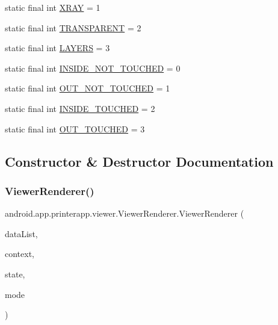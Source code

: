 \begin{DoxyCompactItemize}
\item 
static final int \hyperlink{classandroid_1_1app_1_1printerapp_1_1viewer_1_1_viewer_renderer_ae2e879aa426ef0bd7d4e5b78022bbc43}{X\+R\+AY} = 1
\item 
static final int \hyperlink{classandroid_1_1app_1_1printerapp_1_1viewer_1_1_viewer_renderer_acc60cdcb6df6d01f44e621bc38c82dea}{T\+R\+A\+N\+S\+P\+A\+R\+E\+NT} = 2
\item 
static final int \hyperlink{classandroid_1_1app_1_1printerapp_1_1viewer_1_1_viewer_renderer_a87a1aa256f7260b3e0dbb63f94916011}{L\+A\+Y\+E\+RS} = 3
\item 
static final int \hyperlink{classandroid_1_1app_1_1printerapp_1_1viewer_1_1_viewer_renderer_a57bbafdb88518add736565dc24d11124}{I\+N\+S\+I\+D\+E\+\_\+\+N\+O\+T\+\_\+\+T\+O\+U\+C\+H\+ED} = 0
\item 
static final int \hyperlink{classandroid_1_1app_1_1printerapp_1_1viewer_1_1_viewer_renderer_a6ea42cbf2db28c2ed76eb4e4e01f6c34}{O\+U\+T\+\_\+\+N\+O\+T\+\_\+\+T\+O\+U\+C\+H\+ED} = 1
\item 
static final int \hyperlink{classandroid_1_1app_1_1printerapp_1_1viewer_1_1_viewer_renderer_ac792f900bcc530321dc93b0e16e62b48}{I\+N\+S\+I\+D\+E\+\_\+\+T\+O\+U\+C\+H\+ED} = 2
\item 
static final int \hyperlink{classandroid_1_1app_1_1printerapp_1_1viewer_1_1_viewer_renderer_ae64221f993d4a6c4b3dc37e11490651d}{O\+U\+T\+\_\+\+T\+O\+U\+C\+H\+ED} = 3
\end{DoxyCompactItemize}


\subsection{Constructor \& Destructor Documentation}
\mbox{\label{classandroid_1_1app_1_1printerapp_1_1viewer_1_1_viewer_renderer_ad86f712d654cbdae5064c329365dddfc}} 
\subsubsection{\texorpdfstring{Viewer\+Renderer()}{ViewerRenderer()}}
{\footnotesize\ttfamily android.\+app.\+printerapp.\+viewer.\+Viewer\+Renderer.\+Viewer\+Renderer (\begin{DoxyParamCaption}\item[{List$<$ \hyperlink{classandroid_1_1app_1_1printerapp_1_1viewer_1_1_data_storage}{Data\+Storage} $>$}]{data\+List,  }\item[{Context}]{context,  }\item[{int}]{state,  }\item[{int}]{mode }\end{DoxyParamCaption})}



